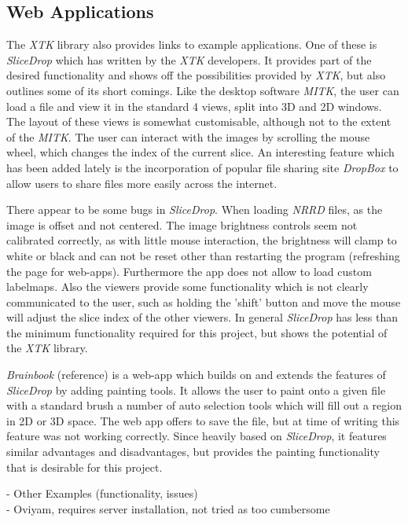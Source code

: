 \documentclass[a4paper,11pt,titlepage]{article}
\begin{document}
\subsection{Web Applications}
The \textit{XTK} library also provides links to example applications. One of these is \textit{SliceDrop} which has written by the \textit{XTK} developers. It provides part of the desired functionality and shows off the possibilities provided by \textit{XTK}, but also outlines some of its short comings. Like the desktop software \textit{MITK}, the user can load a file and view it in the standard 4 views, split into 3D and 2D windows. The layout of these views is somewhat customisable, although not to the extent of the \textit{MITK}. The user can interact with the images by scrolling the mouse wheel, which changes the index of the current slice. An interesting feature which has been added lately is the incorporation of popular file sharing site \textit{DropBox} to allow users to share files more easily across the internet.

There appear to be some bugs in \textit{SliceDrop}. When loading \textit{NRRD} files, as the image is offset and not centered. The image brightness controls seem not calibrated correctly, as with little mouse interaction, the brightness will clamp to white or black and can not be reset other than restarting the program (refreshing the page for web-apps). Furthermore the app does not allow to load custom labelmaps. Also the viewers provide some functionality which is not clearly communicated to the user, such as holding the 'shift' button and move the mouse will adjust the slice index of the other viewers. In general \textit{SliceDrop} has less than the minimum functionality required for this project, but shows the potential of the \textit{XTK} library. 

\textit{Brainbook} (reference) is a web-app which builds on and extends the features of \textit{SliceDrop} by adding painting tools. It allows the user to paint onto a given file with a standard brush a number of auto selection tools which will fill out a region in 2D or 3D space. The web app offers to save the file, but at time of writing this feature was not working correctly. Since heavily based on \textit{SliceDrop}, it features similar advantages and disadvantages, but provides the painting functionality that is desirable for this project.

- Other Examples (functionality, issues)\\
- Oviyam, requires server installation, not tried as too cumbersome
\end{document}
